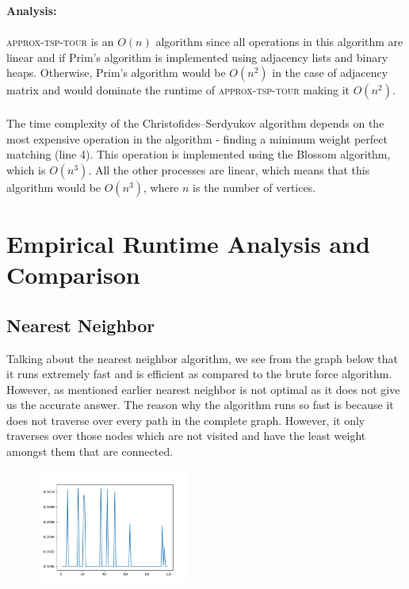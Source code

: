 \documentclass[11pt]{article}
\begin{document}
  \textbf{Analysis:} \paragraph{}
  \textsc{approx-tsp-tour} is an $O(n)$ algorithm since all operations in this algorithm are linear and if Prim's algorithm is 
  implemented using adjacency lists and binary heaps. Otherwise, Prim's algorithm would be $O(n^2)$ in the 
  case of adjacency matrix and would dominate the runtime of \textsc{approx-tsp-tour} making it $O(n^2)$.
  \paragraph{} The time complexity of the Christofides–Serdyukov algorithm depends on the most expensive operation in the 
  algorithm - finding a minimum weight perfect matching (line 4). This operation is implemented using the Blossom algorithm, which is $O(n^3)$. All the other 
  processes are linear, which means that this algorithm would be $O(n^3)$, where $n$ is the number of vertices. 



\section{Empirical Runtime Analysis and Comparison}


\subsection{Nearest Neighbor}

Talking about the nearest neighbor algorithm, we see from the graph below that it runs extremely fast and is efficient as compared to the brute force algorithm. However, as mentioned earlier nearest neighbor is not optimal as it does not give us the accurate answer. The reason why the algorithm runs so fast is because it does not traverse over every path in the complete graph. However, it only traverses over those nodes which are not visited and have the least weight amongst them that are connected.
\begin{figure}[htp]
    \centering
    \includegraphics[width=5cm]{NN1fig2.png}
    \label{fig:galaxy}
\end{figure}
\end{document}
